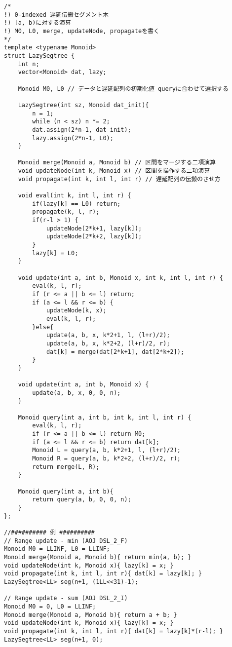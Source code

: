\documentclass[11pt,a4paper]{jsarticle}
\newcommand{\minititle}[1]{\medskip{\large \sf #1}\medskip}
\begin{document}
\newpage
\minititle{遅延伝搬 Segment Tree}
\begin{lstlisting}
/*
!) 0-indexed 遅延伝搬セグメント木
!) [a, b)に対する演算
!) M0, L0, merge, updateNode, propagateを書く
*/
template <typename Monoid>
struct LazySegtree {
    int n;
    vector<Monoid> dat, lazy;

    Monoid M0, L0 // データと遅延配列の初期化値 queryに合わせて選択する

    LazySegtree(int sz, Monoid dat_init){
        n = 1;
        while (n < sz) n *= 2;
        dat.assign(2*n-1, dat_init);
        lazy.assign(2*n-1, L0);
    }

    Monoid merge(Monoid a, Monoid b) // 区間をマージする二項演算
    void updateNode(int k, Monoid x) // 区間を操作する二項演算
    void propagate(int k, int l, int r) // 遅延配列の伝搬のさせ方

    void eval(int k, int l, int r) {
        if(lazy[k] == L0) return;
        propagate(k, l, r);
        if(r-l > 1) {
            updateNode(2*k+1, lazy[k]);
            updateNode(2*k+2, lazy[k]);
        }
        lazy[k] = L0;
    }

    void update(int a, int b, Monoid x, int k, int l, int r) {
        eval(k, l, r);
        if (r <= a || b <= l) return;
        if (a <= l && r <= b) {
            updateNode(k, x);
            eval(k, l, r);
        }else{
            update(a, b, x, k*2+1, l, (l+r)/2);
            update(a, b, x, k*2+2, (l+r)/2, r);
            dat[k] = merge(dat[2*k+1], dat[2*k+2]);
        }
    }

    void update(int a, int b, Monoid x) {
        update(a, b, x, 0, 0, n);
    }

    Monoid query(int a, int b, int k, int l, int r) {
        eval(k, l, r);
        if (r <= a || b <= l) return M0;
        if (a <= l && r <= b) return dat[k];
        Monoid L = query(a, b, k*2+1, l, (l+r)/2);
        Monoid R = query(a, b, k*2+2, (l+r)/2, r);
        return merge(L, R);
    }

    Monoid query(int a, int b){
        return query(a, b, 0, 0, n);
    }
};

//########## 例 ##########
// Range update - min (AOJ DSL_2_F)
Monoid M0 = LLINF, L0 = LLINF;
Monoid merge(Monoid a, Monoid b){ return min(a, b); }
void updateNode(int k, Monoid x){ lazy[k] = x; }
void propagate(int k, int l, int r){ dat[k] = lazy[k]; }
LazySegtree<LL> seg(n+1, (1LL<<31)-1);

// Range update - sum (AOJ DSL_2_I)
Monoid M0 = 0, L0 = LLINF;
Monoid merge(Monoid a, Monoid b){ return a + b; }
void updateNode(int k, Monoid x){ lazy[k] = x; }
void propagate(int k, int l, int r){ dat[k] = lazy[k]*(r-l); }
LazySegtree<LL> seg(n+1, 0);


\end{lstlisting}
\end{document}
